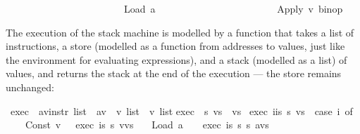 \begin{isabellebody}
\ \ \ \ \ \ \ \ \ \ \ \ \ \ \ \ \ \ \ \ \ \ \ {}\ Load\ {}a\isanewline
\ \ \ \ \ \ \ \ \ \ \ \ \ \ \ \ \ \ \ \ \ \ \ {}\ Apply\ {}{}v\ binop{}%
\begin{isamarkuptext}%
The execution of the stack machine is modelled by a function
 that takes a list of instructions, a store (modelled as a
function from addresses to values, just like the environment for
evaluating expressions), and a stack (modelled as a list) of values,
and returns the stack at the end of the execution --- the store remains
unchanged:%
\end{isamarkuptext}%
\isamarkuptrue%
\isamarkupfalse%
\ exec\ {}{}\ {}{}{}a{}{}v{}instr\ list\ {}\ {}{}a{}{}v{}\ {}\ {}v\ list\ {}\ {}v\ list{}\isanewline
{}\isanewline
{}exec\ {}{}\ s\ vs\ {}\ vs{}\ {}\isanewline
{}exec\ {}i{}is{}\ s\ vs\ {}\ {}case\ i\ of\isanewline
\ \ \ \ Const\ v\ \ {}\ exec\ is\ s\ {}v{}vs{}\isanewline
\ \ {}\ Load\ a\ \ \ {}\ exec\ is\ s\ {}{}s\ a{}{}vs{}\isanewline

\end{isabellebody}

